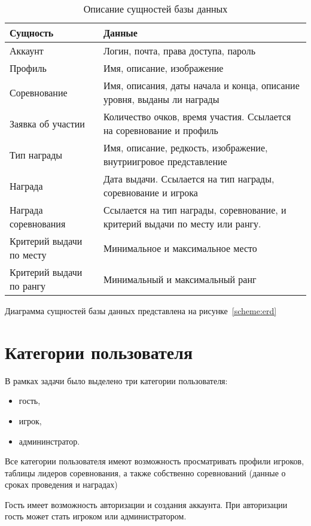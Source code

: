 \begin{table}[h!]
	\centering
	\caption{\label{tbl:dataop}Описание сущностей базы данных}
	\begin{tabular}{|l|p{8cm}|}
		\hline
		Сущность & Данные \\\hline
		Аккаунт & Логин, почта, права доступа, пароль \\\hline
		Профиль & Имя, описание, изображение \\\hline
		Соревнование & Имя, описания, даты начала и конца, описание уровня, выданы ли награды \\\hline
		Заявка об участии & Количество очков, время участия. Ссылается на соревнование и профиль \\\hline
		Тип награды & Имя, описание, редкость, изображение, внутриигровое представление\\\hline
		Награда & Дата выдачи. Ссылается на тип награды, соревнование и игрока \\\hline
		Награда соревнования & Ссылается на тип награды, соревнование, и критерий выдачи по месту или рангу.\\\hline
		Критерий выдачи по месту & Минимальное и максимальное место \\\hline
		Критерий выдачи по рангу & Минимальный и максимальный ранг \\\hline
	\end{tabular}
\end{table}
\FloatBarrier
Диаграмма сущностей базы данных представлена на рисунке~\ref{scheme:erd}

\FloatBarrier
\section{Категории пользователя}

В рамках задачи было выделено три категории пользователя:
\begin{itemize}
	\item гость,
	\item игрок,
	\item админинстратор.
\end{itemize}

Все категории пользователя имеют возможность просматривать профили игроков, таблицы лидеров соревнования, а также собственно соревнований (данные о сроках проведения и наградах)

Гость имеет возможность авторизации и создания аккаунта. При авторизации гость может стать игроком или администратором.

